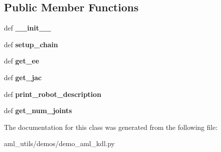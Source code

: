 \subsection*{Public Member Functions}
\begin{DoxyCompactItemize}
\item 
\hypertarget{classdemo__aml__kdl_1_1_demo_k_d_l_ae0edf445250b42bb171406c2f60dd5d2}{def {\bfseries \-\_\-\-\_\-init\-\_\-\-\_\-}}\label{classdemo__aml__kdl_1_1_demo_k_d_l_ae0edf445250b42bb171406c2f60dd5d2}

\item 
\hypertarget{classdemo__aml__kdl_1_1_demo_k_d_l_abf72f3889b6ce2f80cc7a04e45a93503}{def {\bfseries setup\-\_\-chain}}\label{classdemo__aml__kdl_1_1_demo_k_d_l_abf72f3889b6ce2f80cc7a04e45a93503}

\item 
\hypertarget{classdemo__aml__kdl_1_1_demo_k_d_l_a7d4ff24cc9260941607f88aabc8aa2bd}{def {\bfseries get\-\_\-ee}}\label{classdemo__aml__kdl_1_1_demo_k_d_l_a7d4ff24cc9260941607f88aabc8aa2bd}

\item 
\hypertarget{classdemo__aml__kdl_1_1_demo_k_d_l_a2dae88c3ec033a68a7148eaba2dc125c}{def {\bfseries get\-\_\-jac}}\label{classdemo__aml__kdl_1_1_demo_k_d_l_a2dae88c3ec033a68a7148eaba2dc125c}

\item 
\hypertarget{classdemo__aml__kdl_1_1_demo_k_d_l_a4133c9bc084bc98ebc489e0969d1b554}{def {\bfseries print\-\_\-robot\-\_\-description}}\label{classdemo__aml__kdl_1_1_demo_k_d_l_a4133c9bc084bc98ebc489e0969d1b554}

\item 
\hypertarget{classdemo__aml__kdl_1_1_demo_k_d_l_a690d6eb917287a099a6c8d89f2fe336d}{def {\bfseries get\-\_\-num\-\_\-joints}}\label{classdemo__aml__kdl_1_1_demo_k_d_l_a690d6eb917287a099a6c8d89f2fe336d}

\end{DoxyCompactItemize}


The documentation for this class was generated from the following file\-:\begin{DoxyCompactItemize}
\item 
aml\-\_\-utils/demos/demo\-\_\-aml\-\_\-kdl.\-py\end{DoxyCompactItemize}
